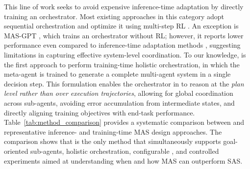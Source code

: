 


This line of work seeks to avoid expensive inference-time adaptation by directly training an orchestrator. Most existing approaches in this category adopt sequential orchestration and optimize it using multi-step RL \citep{su2025toolorchestraelevatingintelligenceefficient,nie2025weakforstrong}.
An exception is MAS-GPT \citep{ye2025masgpttrainingllmsbuild}, which trains an orchestrator without RL; however, it reports lower performance even compared to inference-time adaptation methods \citep{Ke2025MASZero}, suggesting limitations in capturing effective system-level coordination.
To our knowledge, \ourframework is the first approach to perform training-time holistic orchestration, in which the meta-agent is trained to generate a complete multi-agent system in a single decision step. This formulation enables the orchestrator in \ourframework to reason at the {\emph{plan level rather than over execution trajectories}}, allowing for global coordination across sub-agents, avoiding error accumulation from intermediate states, and directly aligning training objectives with end-task performance.
Table~\ref{tab:method_comparison} provides a systematic comparison between \ourframework and representative inference- and training-time MAS design approaches. The comparison shows that \ourframework is the only method that simultaneously supports goal-oriented sub-agents, holistic orchestration, configurable \masness, and controlled experiments aimed at understanding when and how MAS can outperform SAS.





